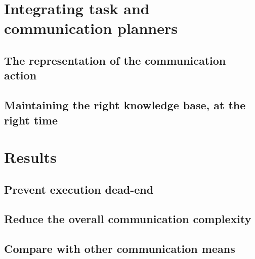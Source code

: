 \section{Integrating task and communication planners}



\subsection{The representation of the communication action}

\subsection{Maintaining the right knowledge base, at the right time}

\section{Results}

\subsection{Prevent execution dead-end}

\subsection{Reduce the overall communication complexity}

\subsection{Compare with other communication means}

